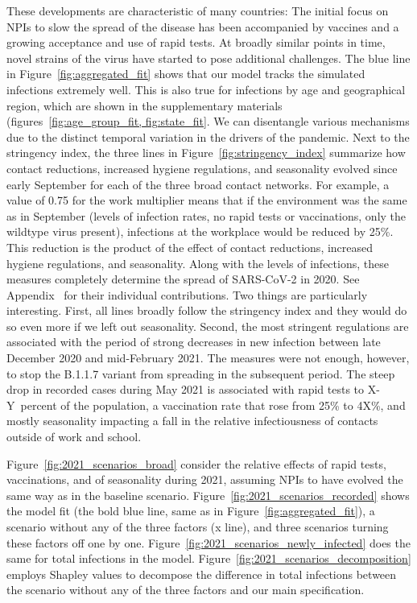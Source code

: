 These developments are characteristic of many countries: The initial focus on NPIs to
slow the spread of the disease has been accompanied by vaccines and a growing acceptance
and use of rapid tests. At broadly similar points in time, novel strains of the virus
have started to pose additional challenges. The blue line in
Figure~\ref{fig:aggregated_fit} shows that our model tracks the simulated infections
extremely well. This is also true for infections by age and geographical region, which
are shown in the supplementary materials (figures~\ref{fig:age_group_fit,
fig:state_fit}. We can disentangle various mechanisms due to the distinct temporal
variation in the drivers of the pandemic. Next to the stringency index, the three lines
in Figure~\ref{fig:stringency_index} summarize how contact reductions, increased hygiene
regulations, and seasonality evolved since early September for each of the three broad
contact networks. For example, a value of 0.75 for the work multiplier means that if the
environment was the same as in September (levels of infection rates, no rapid tests or
vaccinations, only the wildtype virus present), infections at the workplace would be
reduced by 25\%. This reduction is the product of the effect of contact reductions,
increased hygiene regulations, and seasonality. Along with the levels of infections,
these measures completely determine the spread of SARS-CoV-2 in
2020. See Appendix~  for their individual
contributions. Two things are particularly interesting. First, all lines broadly follow
the stringency index and they would do so even more if we left out seasonality. Second,
the most stringent regulations are associated with the period of strong decreases in new
infection between late December 2020 and mid-February 2021. The measures were not
enough, however, to stop the B.1.1.7 variant from spreading in the subsequent period.
The steep drop in recorded cases during May 2021 is associated with rapid tests to
X-Y~percent of the population, a vaccination rate that rose from 25\% to 4X\%, and
mostly seasonality impacting a fall in the relative infectiousness of contacts outside
of work and school.

Figure~\ref{fig:2021_scenarios_broad} consider the relative effects of rapid tests,
vaccinations, and of seasonality during 2021, assuming NPIs to have evolved the same way
as in the baseline scenario. Figure~\ref{fig:2021_scenarios_recorded} shows the model
fit (the bold blue line, same as in
Figure~\ref{fig:aggregated_fit}), a scenario without any of the three factors (x line),
and three scenarios turning these factors off one by one.
Figure~\ref{fig:2021_scenarios_newly_infected} does the same for total infections in the
model. Figure~\ref{fig:2021_scenarios_decomposition} employs Shapley values to decompose
the difference in total infections between the scenario without any of the three factors
and our main specification.

